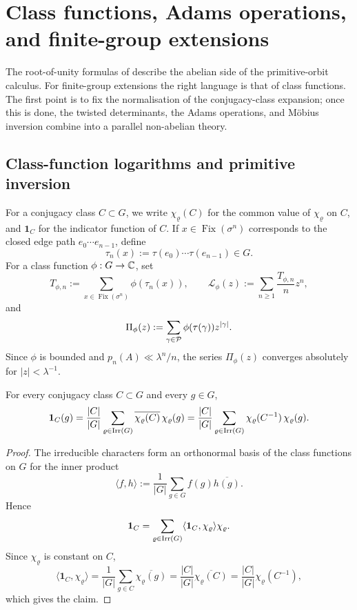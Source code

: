 \section{Class functions, Adams operations, and finite-group extensions}
\label{sec:chebotarev}

The root-of-unity formulas of  describe the
abelian side of the primitive-orbit calculus. For finite-group
extensions the right language is that of class functions. The first
point is to fix the normalisation of the conjugacy-class expansion;
once this is done, the twisted determinants, the Adams operations, and
M\"obius inversion combine into a parallel non-abelian theory.

\subsection{Class-function logarithms and primitive inversion}

For a conjugacy class \(C\subset G\), we write \(\chi_\varrho(C)\) for
the common value of \(\chi_\varrho\) on \(C\), and \(\mathbf 1_C\) for
the indicator function of \(C\). If \(x\in\operatorname{Fix}(\sigma^n)\)
corresponds to the closed edge path \(e_0\cdots e_{n-1}\), define
\[
  \tau_n(x):=\tau(e_0)\cdots\tau(e_{n-1})\in G.
\]
For a class function \(\phi:G\to\mathbb{C}\), set
\begin{equation}\label{eq:class-logarithm-def}
  T_{\phi,n}:=\sum_{x\in\operatorname{Fix}(\sigma^n)}\phi(\tau_n(x)),
  \qquad
  \mathcal L_\phi(z):=\sum_{n\ge 1}\frac{T_{\phi,n}}{n}z^n,
\end{equation}
and
\begin{equation}\label{eq:primitive-class-series-def}
  \Pi_\phi(z):=\sum_{\gamma\in\mathcal P}\phi(\tau(\gamma))z^{|\gamma|}.
\end{equation}
Since \(\phi\) is bounded and \(p_n(A)\ll \lambda^n/n\), the series
\(\Pi_\phi(z)\) converges absolutely for \(|z|<\lambda^{-1}\).

\begin{proposition}
  \label{prop:class-indicator-expansion}
  For every conjugacy class \(C\subset G\) and every \(g\in G\),
  \[
    \mathbf 1_C(g)
    =\frac{|C|}{|G|}
      \sum_{\varrho\in\operatorname{Irr}(G)}
        \overline{\chi_\varrho(C)}\,\chi_\varrho(g)
    =\frac{|C|}{|G|}
      \sum_{\varrho\in\operatorname{Irr}(G)}
        \chi_\varrho(C^{-1})\,\chi_\varrho(g).
  \]
\end{proposition}

\begin{proof}
  The irreducible characters form an orthonormal basis of the class
  functions on \(G\) for the inner product
  \[
    \langle f,h\rangle
    :=\frac{1}{|G|}\sum_{g\in G}f(g)\overline{h(g)}.
  \]
  Hence
  \[
    \mathbf 1_C
    =\sum_{\varrho\in\operatorname{Irr}(G)}
      \langle \mathbf 1_C,\chi_\varrho\rangle \chi_\varrho.
  \]
  Since \(\chi_\varrho\) is constant on \(C\),
  \[
    \langle \mathbf 1_C,\chi_\varrho\rangle
    =\frac{1}{|G|}\sum_{g\in C}\overline{\chi_\varrho(g)}
    =\frac{|C|}{|G|}\overline{\chi_\varrho(C)}
    =\frac{|C|}{|G|}\chi_\varrho(C^{-1}),
  \]
  which gives the claim.
\end{proof}

